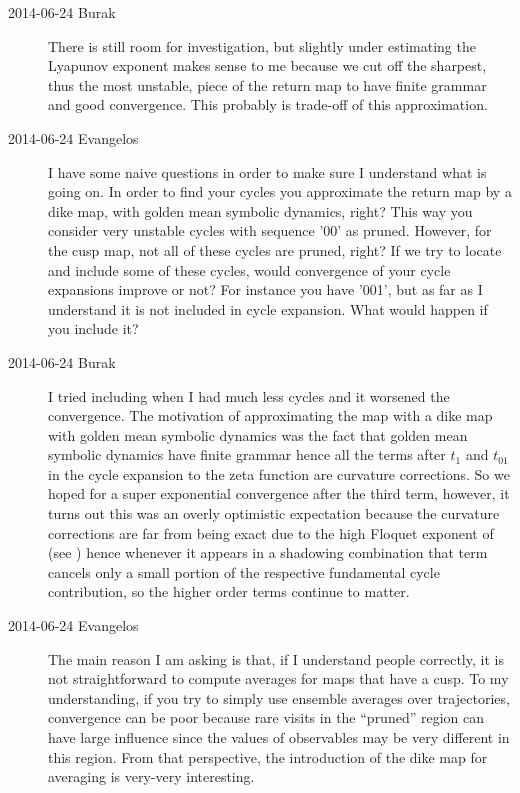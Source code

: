 \begin{description}
\item[2014-06-24 Burak] There is still room for investigation, but slightly under
estimating the Lyapunov exponent makes sense to me because we cut off the sharpest,
thus the most unstable, piece of the return map to have finite grammar and good
convergence. This probably is trade-off of this approximation.

\item[2014-06-24 Evangelos] I have some naive questions in order to make sure I understand what
is going on. In order to find your cycles you approximate the return map by a dike
map, with golden mean symbolic dynamics, right?  This way you consider very unstable cycles 
with sequence '00' as pruned. However, for the cusp map, not all of these cycles are pruned, right?
If we try to locate and include some of these cycles, would convergence of your cycle expansions 
improve or not? For instance you have '001', but as far as I understand it is not included in
cycle expansion. What would happen if you include it?

\item[2014-06-24 Burak] I tried including  when I had much less cycles
and it worsened the convergence. The motivation of approximating the map with a 
dike map with golden mean symbolic dynamics was the fact that golden mean symbolic
dynamics have finite grammar hence all the terms after $t_1$ and $t_{01}$ in the
cycle expansion to the zeta function are curvature corrections. So we hoped
for a super exponential convergence after the third term, however, it turns out
this was an overly optimistic expectation because the curvature corrections are
far from being exact due to the high Floquet exponent of  (see 
) hence whenever it appears in a shadowing combination
that term cancels only a small portion of the respective fundamental cycle 
contribution, so the higher order terms continue to matter. 

\item[2014-06-24 Evangelos] The main reason I am asking is that, if I understand people correctly, it is not straightforward to compute
averages for maps that have a cusp. To my understanding, if you try to simply use ensemble averages
over trajectories, convergence can be poor because rare visits in the ``pruned'' region can have
large influence since the values of observables may be very different in this region.
From that perspective, the introduction of the dike map for averaging is very-very interesting.


\end{description}

